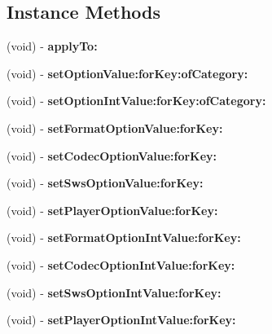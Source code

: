 \subsection*{Instance Methods}
\begin{DoxyCompactItemize}
\item 
\mbox{\label{interface_i_j_k_f_f_options_ae29f9f61780222bfb8c380736a0d5dcb}} 
(void) -\/ {\bfseries apply\+To\+:}
\item 
\mbox{\label{interface_i_j_k_f_f_options_adc680e613d562f938d4e3d1ce13f602c}} 
(void) -\/ {\bfseries set\+Option\+Value\+:for\+Key\+:of\+Category\+:}
\item 
\mbox{\label{interface_i_j_k_f_f_options_a2662ff6776b2e032c93c7a0ad25308a4}} 
(void) -\/ {\bfseries set\+Option\+Int\+Value\+:for\+Key\+:of\+Category\+:}
\item 
\mbox{\label{interface_i_j_k_f_f_options_a4804c7696291b573fe5ed488a8e6f62e}} 
(void) -\/ {\bfseries set\+Format\+Option\+Value\+:for\+Key\+:}
\item 
\mbox{\label{interface_i_j_k_f_f_options_a69c4550c90152176c4752217a85a95a2}} 
(void) -\/ {\bfseries set\+Codec\+Option\+Value\+:for\+Key\+:}
\item 
\mbox{\label{interface_i_j_k_f_f_options_a6e8685c995e629f567b8ae6e1dccb029}} 
(void) -\/ {\bfseries set\+Sws\+Option\+Value\+:for\+Key\+:}
\item 
\mbox{\label{interface_i_j_k_f_f_options_a5c3947f222ff9d5b5d431be5982e0620}} 
(void) -\/ {\bfseries set\+Player\+Option\+Value\+:for\+Key\+:}
\item 
\mbox{\label{interface_i_j_k_f_f_options_a045cd766bac666083d0350a30ea3e99a}} 
(void) -\/ {\bfseries set\+Format\+Option\+Int\+Value\+:for\+Key\+:}
\item 
\mbox{\label{interface_i_j_k_f_f_options_a9807f964a7c017fd51534b85a7f9d4c9}} 
(void) -\/ {\bfseries set\+Codec\+Option\+Int\+Value\+:for\+Key\+:}
\item 
\mbox{\label{interface_i_j_k_f_f_options_a96a640d4e5d94eb9985c23394662da77}} 
(void) -\/ {\bfseries set\+Sws\+Option\+Int\+Value\+:for\+Key\+:}
\item 
\mbox{\label{interface_i_j_k_f_f_options_acb870477e8d099a10148e0bca3311995}} 
(void) -\/ {\bfseries set\+Player\+Option\+Int\+Value\+:for\+Key\+:}
\end{DoxyCompactItemize}
